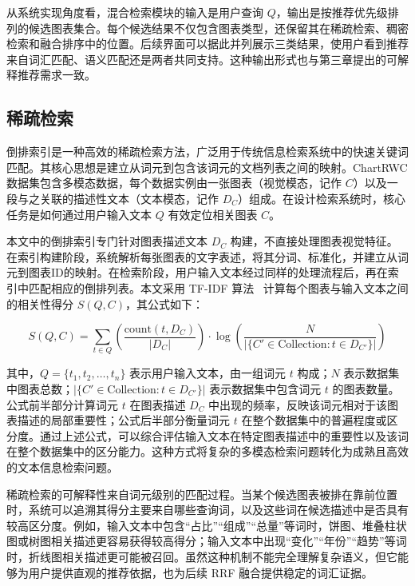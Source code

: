 从系统实现角度看，混合检索模块的输入是用户查询 $Q$，输出是按推荐优先级排列的候选图表集合。每个候选结果不仅包含图表类型，还保留其在稀疏检索、稠密检索和融合排序中的位置。后续界面可以据此并列展示三类结果，使用户看到推荐来自词汇匹配、语义匹配还是两者共同支持。这种输出形式也与第三章提出的可解释推荐需求一致。

\subsection{稀疏检索}

倒排索引是一种高效的稀疏检索方法，广泛用于传统信息检索系统中的快速关键词匹配。其核心思想是建立从词元到包含该词元的文档列表之间的映射。ChartRWC 数据集包含多模态数据，每个数据实例由一张图表（视觉模态，记作 $C$）以及一段与之关联的描述性文本（文本模态，记作 $D_C$）组成。在设计检索系统时，核心任务是如何通过用户输入文本 $Q$ 有效定位相关图表 $C$。

本文中的倒排索引专门针对图表描述文本 $D_C$ 构建，不直接处理图表视觉特征。在索引构建阶段，系统解析每张图表的文字表述，将其分词、标准化，并建立从词元到图表ID的映射。在检索阶段，用户输入文本经过同样的处理流程后，再在索引中匹配相应的倒排列表。本文采用 TF-IDF 算法~\cite{ramos2003using} 计算每个图表与输入文本之间的相关性得分 $S(Q,C)$，其公式如下：

\begin{equation}
S(Q, C) = \sum_{t \in Q} \left( \frac{\text{count}(t, D_C)}{|D_C|} \right) \cdot \log \left( \frac{N}{|\{C' \in \text{Collection}: t \in D_{C'}\}|} \right)
\end{equation}

其中，$Q=\{t_1,t_2,\dots,t_n\}$ 表示用户输入文本，由一组词元 $t$ 构成；$N$ 表示数据集中图表总数；$|\{C' \in \text{Collection}: t \in D_{C'}\}|$ 表示数据集中包含词元 $t$ 的图表数量。公式前半部分计算词元 $t$ 在图表描述 $D_C$ 中出现的频率，反映该词元相对于该图表描述的局部重要性；公式后半部分衡量词元 $t$ 在整个数据集中的普遍程度或区分度。通过上述公式，可以综合评估输入文本在特定图表描述中的重要性以及该词在整个数据集中的区分能力。这种方式将复杂的多模态检索问题转化为成熟且高效的文本信息检索问题。

稀疏检索的可解释性来自词元级别的匹配过程。当某个候选图表被排在靠前位置时，系统可以追溯其得分主要来自哪些查询词，以及这些词在候选描述中是否具有较高区分度。例如，输入文本中包含“占比”“组成”“总量”等词时，饼图、堆叠柱状图或树图相关描述更容易获得较高得分；输入文本中出现“变化”“年份”“趋势”等词时，折线图相关描述更可能被召回。虽然这种机制不能完全理解复杂语义，但它能够为用户提供直观的推荐依据，也为后续 RRF 融合提供稳定的词汇证据。

